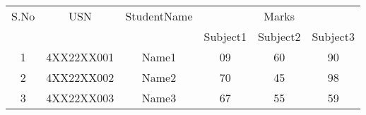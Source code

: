 \documentclass{article}
\begin{document}
\begin{table}[h]
\centering
\begin{tabular}{|c|c|c|c|c|c|}
\hline
S.No & USN & StudentName & \multicolumn{3}{c|}{Marks} \\
\cline{4-6}
 &  &  & Subject1 & Subject2 & Subject3 \\
\hline
1 & 4XX22XX001 & Name1 & 09 & 60 & 90 \\
\hline
2 & 4XX22XX002 & Name2 & 70 & 45 & 98 \\
\hline
3 & 4XX22XX003 & Name3 & 67 & 55 & 59 \\
\hline
\end{tabular}
\end{table}
\end{document}

